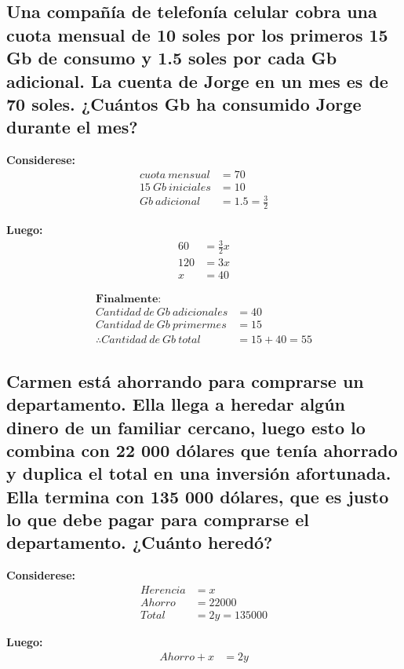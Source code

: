 \documentclass[11pt, a4paper]{article}
\begin{document}
\subsection{Una compañía de telefonía celular cobra una cuota mensual de 10 soles por los primeros 15 Gb de consumo y 1.5 soles por cada Gb adicional. La cuenta de Jorge en un mes es de 70 soles. ¿Cuántos Gb ha consumido Jorge durante el mes?}
\begin{multicols}{2}
  \textbf{Considerese:}
  \begin{align*}
  cuota\ mensual &= 70 \\
  15\ Gb\ iniciales &= 10 \\
  Gb\ adicional &= 1.5 = \frac{3}{2}
  \end{align*}

  \columnbreak %

  \textbf{Luego:}
  \begin{align*}
    60 &= \frac{3}{2} x \\
    120 &= 3x \\
    x &= 40
  \end{align*}
\end{multicols}
\begin{align*}
  \textbf{Finalmente:}\\
  Cantidad\ de\ Gb\ adicionales &= 40\\
  Cantidad\ de\ Gb\ primer mes &= 15\\
  \therefore Cantidad\ de\ Gb\ total &= 15 + 40 = 55
\end{align*}
\subsection{Carmen está ahorrando para comprarse un departamento. Ella llega a heredar algún dinero de un familiar cercano, luego esto lo combina con 22 000 dólares que tenía ahorrado y duplica el total en una inversión afortunada. Ella termina con 135 000 dólares, que es justo lo que debe pagar para comprarse el departamento. ¿Cuánto heredó?}
\begin{multicols}{2}
  \textbf{Considerese:}
  \begin{align*}
  Herencia &= x \\
  Ahorro &= 22000\\
  Total &= 2y = 135000
  \end{align*}

  \columnbreak %

  \textbf{Luego:}
  \begin{align*}
    Ahorro + x &= 2y\\
  \end{align*}
\end{multicols}
\end{document}
